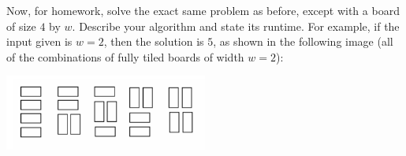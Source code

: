 \documentclass[10pt]{article}
\begin{document}
Now, for homework, solve the exact same problem as before, except with a board of size $4$ by $w$. Describe your algorithm and state its runtime. For example, if the input given is $w=2$, then the solution is $5$, as shown in the following image (all of the combinations of fully tiled boards of width $w=2$):

{\centering
\includegraphics[width=0.5\textwidth]{Dominoes.PNG}
}

\solution{
}


\end{document}
